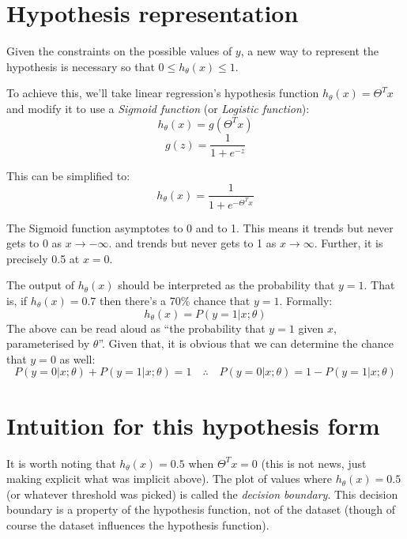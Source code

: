 \section{Hypothesis representation}

Given the constraints on the possible values of $y$, a new way to represent the hypothesis is necessary so that $0 \leq h_\theta(x) \leq 1$.

To achieve this, we'll take linear regression's hypothesis function $h_\theta(x) = \Theta^Tx$ and modify it to use a \emph{Sigmoid function} (or \emph{Logistic function}):
\begin{equation}
\label{Logistic Regression Hypothesis form}
h_\theta(x) = g(\Theta^Tx)
\end{equation}
\begin{equation}
\label{Sigmoid function}
g(z) = \frac{1}{1 + e^{-z}}
\end{equation}

This can be simplified to:
\begin{equation}
\label{Compact logistic regression hypothesis}
h_\theta(x) = \frac{1}{1 + e^{-\Theta^Tx}}
\end{equation}

The Sigmoid function asymptotes to 0 and to 1. This means it trends but never gets to 0 as $x \rightarrow - \infty$. and trends but never gets to 1 as $x \rightarrow \infty$. Further, it is precisely 0.5 at $x = 0$.

The output of $h_\theta(x)$ should be interpreted as the probability that $y = 1$. That is, if $h_\theta(x) = 0.7$ then there's a 70\% chance that $y = 1$. Formally:
\[
h_\theta(x) = P(y=1 | x;\theta)
\]
The above can be read aloud as ``the probability that $y = 1$ given $x$, parameterised by $\theta$''. Given that, it is obvious that we can determine the chance that $y = 0$ as well:
\[
P(y=0 | x;\theta) + P(y=1 | x;\theta) = 1
\quad\therefore\quad
P(y=0 | x;\theta) = 1 - P(y=1 | x;\theta)
\]

\section{Intuition for this hypothesis form}
It is worth noting that $h_\theta(x) = 0.5$ when $\Theta^Tx = 0$ (this is not news, just making explicit what was implicit above). 
The plot of values where $h_\theta(x) = 0.5$ (or whatever threshold was picked) is called the \emph{decision boundary}. This decision boundary is a property of the hypothesis function, not of the dataset (though of course the dataset influences the hypothesis function).

